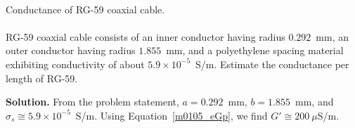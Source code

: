 ~\\ \begin{example} 
\begin{mdframed}[backgroundcolor=brown!20,linecolor=brown!20]\raggedright
Conductance of RG-59 
coaxial cable.
\\~\\
RG-59 coaxial cable consists of an inner conductor having radius $0.292$~mm, an outer conductor having radius $1.855$~mm, and a polyethylene spacing material exhibiting conductivity of about $5.9\times 10^{-5}$~S/m.
Estimate the conductance per length of RG-59.

{\bf Solution.} 
From the problem statement, 
$a=0.292$~mm, 
$b=1.855$~mm, 
and $\sigma_s \cong 5.9\times 10^{-5}$~S/m.
Using Equation~\ref{m0105_eGp}, we find $G'\cong 200~\mu$S/m.

\end{mdframed}\end{example}



